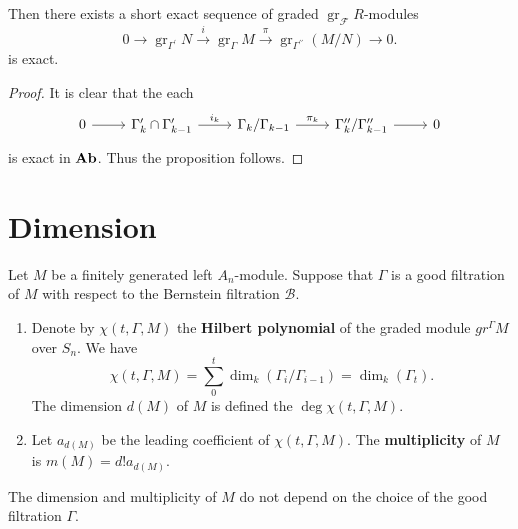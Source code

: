 \documentclass[12pt, oneside]{book}
\begin{document}
\begin{proposition}
    Then there exists a short exact sequence of graded $\operatorname{gr}_{\mathcal{F}}R$-modules
    \begin{equation*}
        0 \longrightarrow \operatorname{gr}_{\Gamma^\prime}N \xrightarrow{i} \operatorname{gr}_{\Gamma}M \xrightarrow{\pi} \operatorname{gr}_{\Gamma^{\prime\prime}}(M / N) \longrightarrow 0 .
    \end{equation*}
    is exact.
    \begin{proof}
        It is clear that the each
        \begin{equation*}
            \begin{tikzcd}
                0 \arrow[r]&  \Gamma_k^\prime  \cap \Gamma_{k-1}^\prime \arrow[r,"i_k"] & \Gamma_k / \Gamma_{k-1} \arrow[r,"\pi_k"] & \Gamma_k^{\prime\prime} /\Gamma_{k-1}^{\prime\prime} \arrow[r]& 0
            \end{tikzcd}
        \end{equation*}
        is exact in $\mathbf{Ab}$. Thus the proposition follows.
    \end{proof}
\end{proposition}





\section{Dimension}
\begin{definition}
    Let $M$ be a finitely generated left $A_n$-module. Suppose that $\Gamma$ is a good filtration of $M$ with respect to the Bernstein filtration $\mathcal{B}$.
    \begin{enumerate}
        \item
              Denote by $\chi(t, \Gamma, M)$ the \textbf{Hilbert polynomial} of the graded module $g r^{\Gamma} M$ over $S_n$.
              We have
              \begin{equation*}
                  \chi(t, \Gamma, M)=\sum_0^t \operatorname{dim}_k\left(\Gamma_i / \Gamma_{i-1}\right)=\operatorname{dim}_k\left(\Gamma_t\right) .
              \end{equation*}
              The dimension $d(M)$ of $M$ is defined the $\deg\chi(t, \Gamma, M)$.
        \item
              Let $a_{d(M)}$ be the leading coefficient of $\chi(t, \Gamma, M)$. The \textbf{multiplicity} of $M$ is $m(M)=d!a_{d(M)}$.
    \end{enumerate}
    \begin{remark}
        The dimension and multiplicity of $M$ do not depend on the choice of the good filtration $\Gamma$.
    \end{remark}
\end{definition}
\end{document}
